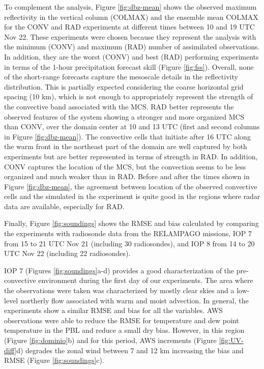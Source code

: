 \documentclass[final,5p,times,twocolumn,authoryear]{elsarticle} %
\begin{document}
To complement the analysis, Figure \ref{fig:dbz-mean} shows the observed maximum reflectivity in the vertical column (COLMAX) and the ensemble mean COLMAX for the CONV and RAD experiments at different times between 10 and 19 UTC Nov 22. These experiments were chosen because they represent the analysis with the minimum (CONV) and maximum (RAD) number of assimilated observations. In addition, they are the worst (CONV) and best (RAD) performing experiments in terms of the 1-hour precipitation forecast skill (Figure \ref{fig:fss}). Overall, none of the short-range forecasts capture the mesoscale details in the reflectivity distribution. This is partially expected considering the coarse horizontal grid spacing (10 km), which is not enough to appropriately represent the strength of the convective band associated with the MCS. RAD better represents the observed features of the system showing a stronger and more organized MCS than CONV, over the domain center at 10 and 13 UTC (first and second columns in Figure \ref{fig:dbz-mean}). The convective cells that initiate after 16 UTC along the warm front in the northeast part of the domain are well captured by both experiments but are better represented in terms of strength in RAD. In addition, CONV captures the location of the MCS, but the convection seems to be less organized and much weaker than in RAD. Before and after the times shown in Figure \ref{fig:dbz-mean}, the agreement between location of the observed convective cells and the simulated in the experiment is quite good in the regions where radar data are available, especially for RAD.

Finally, Figure \ref{fig:soundings} shows the RMSE and bias calculated by comparing the experiments with radiosonde data from the RELAMPAGO missions, IOP 7 from 15 to 21 UTC Nov 21 (including 30 radiosondes), and IOP 8 from 14 to 20 UTC Nov 22 (including 22 radiosondes).

IOP 7 (Figures \ref{fig:soundings}a-d) provides a good characterization of the pre-convective environment during the first day of our experiments. The area where the observations were taken was characterized by mostly clear skies and a low-level northerly flow associated with warm and moist advection. In general, the experiments show a similar RMSE and bias for all the variables. AWS observations were able to reduce the RMSE for temperature and dew point temperature in the PBL and reduce a small dry bias. However, in this region (Figure \ref{fig:dominio}b) and for this period, AWS increments (Figure \ref{fig:UV-diff}d) degrades the zonal wind between 7 and 12 km increasing the bias and RMSE (Figure \ref{fig:soundings}c).
\end{document}
